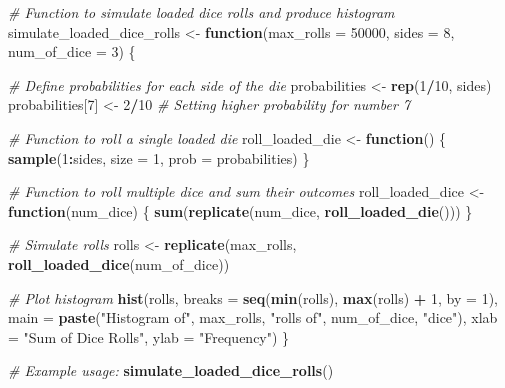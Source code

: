 \documentclass[
]{article}
\newenvironment{Shaded}{\begin{snugshade}}{\end{snugshade}}
\newcommand{\AttributeTok}[1]{\textcolor[rgb]{0.13,0.29,0.53}{#1}}
\newcommand{\CommentTok}[1]{\textcolor[rgb]{0.56,0.35,0.01}{\textit{#1}}}
\newcommand{\ControlFlowTok}[1]{\textcolor[rgb]{0.13,0.29,0.53}{\textbf{#1}}}
\newcommand{\DecValTok}[1]{\textcolor[rgb]{0.00,0.00,0.81}{#1}}
\newcommand{\FunctionTok}[1]{\textcolor[rgb]{0.13,0.29,0.53}{\textbf{#1}}}
\newcommand{\NormalTok}[1]{#1}
\newcommand{\OtherTok}[1]{\textcolor[rgb]{0.56,0.35,0.01}{#1}}
\newcommand{\SpecialCharTok}[1]{\textcolor[rgb]{0.81,0.36,0.00}{\textbf{#1}}}
\newcommand{\StringTok}[1]{\textcolor[rgb]{0.31,0.60,0.02}{#1}}
\begin{document}
\begin{Shaded}
\begin{Highlighting}[]
\CommentTok{\# Function to simulate loaded dice rolls and produce histogram}
\NormalTok{simulate\_loaded\_dice\_rolls }\OtherTok{\textless{}{-}} \ControlFlowTok{function}\NormalTok{(}\AttributeTok{max\_rolls =} \DecValTok{50000}\NormalTok{, }\AttributeTok{sides =} \DecValTok{8}\NormalTok{, }\AttributeTok{num\_of\_dice =} \DecValTok{3}\NormalTok{) \{}
  
  \CommentTok{\# Define probabilities for each side of the die}
\NormalTok{  probabilities }\OtherTok{\textless{}{-}} \FunctionTok{rep}\NormalTok{(}\DecValTok{1}\SpecialCharTok{/}\DecValTok{10}\NormalTok{, sides)}
\NormalTok{  probabilities[}\DecValTok{7}\NormalTok{] }\OtherTok{\textless{}{-}} \DecValTok{2}\SpecialCharTok{/}\DecValTok{10}  \CommentTok{\# Setting higher probability for number 7}
  
  \CommentTok{\# Function to roll a single loaded die}
\NormalTok{  roll\_loaded\_die }\OtherTok{\textless{}{-}} \ControlFlowTok{function}\NormalTok{() \{}
    \FunctionTok{sample}\NormalTok{(}\DecValTok{1}\SpecialCharTok{:}\NormalTok{sides, }\AttributeTok{size =} \DecValTok{1}\NormalTok{, }\AttributeTok{prob =}\NormalTok{ probabilities)}
\NormalTok{  \}}
  
  \CommentTok{\# Function to roll multiple dice and sum their outcomes}
\NormalTok{  roll\_loaded\_dice }\OtherTok{\textless{}{-}} \ControlFlowTok{function}\NormalTok{(num\_dice) \{}
    \FunctionTok{sum}\NormalTok{(}\FunctionTok{replicate}\NormalTok{(num\_dice, }\FunctionTok{roll\_loaded\_die}\NormalTok{()))}
\NormalTok{  \}}
  
  \CommentTok{\# Simulate rolls}
\NormalTok{  rolls }\OtherTok{\textless{}{-}} \FunctionTok{replicate}\NormalTok{(max\_rolls, }\FunctionTok{roll\_loaded\_dice}\NormalTok{(num\_of\_dice))}
  
  \CommentTok{\# Plot histogram}
  \FunctionTok{hist}\NormalTok{(rolls, }\AttributeTok{breaks =} \FunctionTok{seq}\NormalTok{(}\FunctionTok{min}\NormalTok{(rolls), }\FunctionTok{max}\NormalTok{(rolls) }\SpecialCharTok{+} \DecValTok{1}\NormalTok{, }\AttributeTok{by =} \DecValTok{1}\NormalTok{), }
       \AttributeTok{main =} \FunctionTok{paste}\NormalTok{(}\StringTok{"Histogram of"}\NormalTok{, max\_rolls, }\StringTok{"rolls of"}\NormalTok{, num\_of\_dice, }\StringTok{"dice"}\NormalTok{),}
       \AttributeTok{xlab =} \StringTok{"Sum of Dice Rolls"}\NormalTok{,}
       \AttributeTok{ylab =} \StringTok{"Frequency"}\NormalTok{)}
\NormalTok{\}}

\CommentTok{\# Example usage:}
\FunctionTok{simulate\_loaded\_dice\_rolls}\NormalTok{()}
\end{Highlighting}
\end{Shaded}
\end{document}
